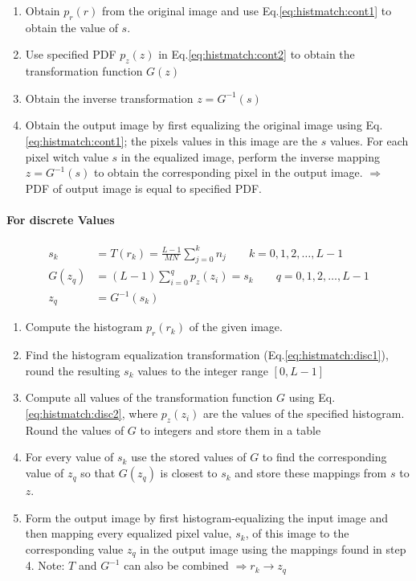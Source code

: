 \begin{enumerate}
  \item Obtain $p_r(r)$ from the original image and use Eq.\ref{eq:histmatch:cont1} to obtain the value of $s$.
  \item Use specified PDF $p_z(z)$ in Eq.\ref{eq:histmatch:cont2} to obtain the transformation function $G(z)$
  \item Obtain the inverse transformation $z = G^{-1}(s)$
  \item Obtain the output image by first equalizing the original image using Eq.\ref{eq:histmatch:cont1}; the pixels values in this image are the $s$ values.
  	For each pixel witch value $s$ in the equalized image, perform the inverse mapping $z = G^{-1}(s)$ to obtain the corresponding pixel in the output image. $\Rightarrow$ PDF of output image is equal to specified PDF.
\end{enumerate}

\paragraph{For discrete Values}
\begin{align}
	s_k		&= T(r_k) = \frac{L-1}{MN}\sum_{j=0}^{k} n_j \qquad 
      k = 0,1,2,\ldots,L-1 \label{eq:histmatch:disc1} \\
	G(z_q)	&= (L-1) \sum_{i=0}^q p_z(z_i) = s_k  \qquad   
      q = 0,1,2,\ldots,L-1\label{eq:histmatch:disc2}  \\
	z_q 	&= G^{-1}(s_k)	 
\end{align}

\begin{enumerate}
  \item Compute the histogram $p_r(r_k)$ of the given image.
  \item Find the histogram equalization transformation (Eq.\ref{eq:histmatch:disc1}), round the resulting $s_k$
  	values to the integer range $[0, L-1]$
  \item Compute all values of the transformation function $G$ using Eq.\ref{eq:histmatch:disc2}, where $p_z(z_i)$ are the values
  	of the specified histogram. Round the values of $G$ to integers and store them in a table
  \item For every value of $s_k$ use the stored values of $G$ to find the corresponding value of $z_q$ so that $G(z_q)$ is 
  	closest to $s_k$ and store these mappings from $s$ to $z$.
  \item Form the output image by first histogram-equalizing the input image and then mapping every equalized pixel value, $s_k$, of this
  	image to the corresponding value $z_q$ in the output image using the mappings found in step 4. Note: $T$ and $G^{-1}$ can also be combined $\Rightarrow r_k \rightarrow z_q$
\end{enumerate}


